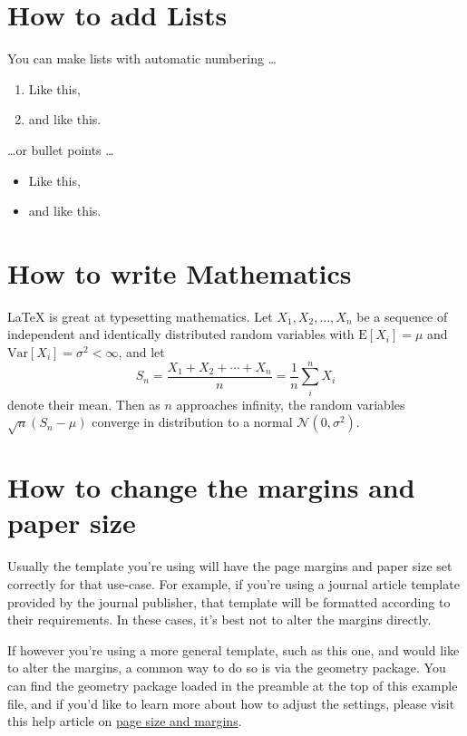 \documentclass[a4paper,12pt]{scrreprt}
\begin{document}
\section{How to add Lists}

You can make lists with automatic numbering \dots

\begin{enumerate}
\item Like this,
\item and like this.
\end{enumerate}
\dots or bullet points \dots
\begin{itemize}
\item Like this,
\item and like this.
\end{itemize}

\section{How to write Mathematics}

\LaTeX{} is great at typesetting mathematics. Let $X_1, X_2, \ldots, X_n$ be a sequence of independent and identically distributed random variables with $\text{E}[X_i] = \mu$ and $\text{Var}[X_i] = \sigma^2 < \infty$, and let
\[S_n = \frac{X_1 + X_2 + \cdots + X_n}{n}
      = \frac{1}{n}\sum_{i}^{n} X_i\]
denote their mean. Then as $n$ approaches infinity, the random variables $\sqrt{n}(S_n - \mu)$ converge in distribution to a normal $\mathcal{N}(0, \sigma^2)$.


\section{How to change the margins and paper size}

Usually the template you're using will have the page margins and paper size set correctly for that use-case. For example, if you're using a journal article template provided by the journal publisher, that template will be formatted according to their requirements. In these cases, it's best not to alter the margins directly.

If however you're using a more general template, such as this one, and would like to alter the margins, a common way to do so is via the geometry package. You can find the geometry package loaded in the preamble at the top of this example file, and if you'd like to learn more about how to adjust the settings, please visit this help article on \href{https://www.overleaf.com/learn/latex/page_size_and_margins}{page size and margins}.
\end{document}
